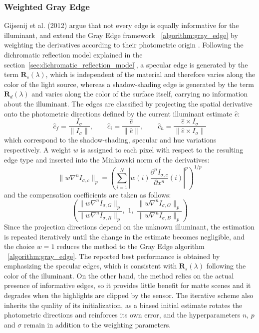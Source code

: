 \subsubsection{Weighted Gray Edge}
\label{algorithm:weighted_gray_edge}
Gijsenij et al. (2012) argue that not every edge is equally informative for the illuminant, and extend the Gray Edge framework ~\ref{algorithm:gray_edge} by weighting the derivatives according to their photometric origin \cite{weightedGrayEdge}. Following the dichromatic reflection model explained in the section~\ref{sec:dichromatic_reflection_model}, a specular edge is generated by the term $\mathbf{R}_s(\lambda)$, which is independent of the material and therefore varies along the color of the light source, whereas a shadow-shading edge is generated by the term $\mathbf{R}_d(\lambda)$ and varies along the color of the surface itself, carrying no information about the illuminant. The edges are classified by projecting the spatial derivative onto the photometric directions defined by the current illuminant estimate $\hat{e}$:
\begin{equation}
\hat{c}_f = \frac{I_{\sigma}}{\| I_{\sigma} \|}, \qquad
\hat{c}_i = \frac{\hat{e}}{\| \hat{e} \|}, \qquad
\hat{c}_h = \frac{\hat{e} \times I_{\sigma}}{\| \hat{e} \times I_{\sigma} \|}
\end{equation}
which correspond to the shadow-shading, specular and hue variations respectively. A weight $w$ is assigned to each pixel with respect to the resulting edge type and inserted into the Minkowski norm of the derivatives:
\begin{equation}
\| w \nabla^n I_{\sigma,c} \|_p = \left( \sum_{i=1}^{N} \left| w(i) \frac{\partial^n I_{\sigma,c}}{\partial x^n} (i) \right|^p \right)^{1/p}
\end{equation}
and the compensation coefficients are taken as follows:
\[
\left( \frac{\| w \nabla^n I_{\sigma,G} \|_p}{\| w \nabla^n I_{\sigma,R} \|_p}, \,\, 1, \,\, \frac{\| w \nabla^n I_{\sigma,G} \|_p}{\| w \nabla^n I_{\sigma,B} \|_p} \right)
\]
Since the projection directions depend on the unknown illuminant, the estimation is repeated iteratively until the change in the estimate becomes negligible, and the choice $w = 1$ reduces the method to the Gray Edge algorithm ~\ref{algorithm:gray_edge}. The reported best performance is obtained by emphasizing the specular edges, which is consistent with $\mathbf{R}_s(\lambda)$ following the color of the illuminant. On the other hand, the method relies on the actual presence of informative edges, so it provides little benefit for matte scenes and it degrades when the highlights are clipped by the sensor. The iterative scheme also inherits the quality of its initialization, as a biased initial estimate rotates the photometric directions and reinforces its own error, and the hyperparameters $n$, $p$ and $\sigma$ remain in addition to the weighting parameters.

